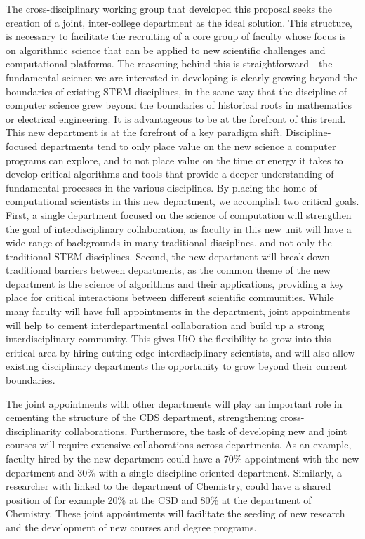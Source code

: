\documentclass[%
oneside,                 %
final,                   %
10pt]{article}
\begin{document}
The cross-disciplinary  working group  that developed this
proposal seeks the creation of a joint, inter-college department as the ideal solution. This
structure, is necessary to facilitate the recruiting of a core
group of faculty whose focus is on algorithmic science that can be applied to new scientific
challenges and computational platforms. The reasoning behind this is straightforward - the
fundamental science we are interested in developing is clearly
growing beyond the boundaries of existing STEM disciplines, in the same way that the discipline
of computer science grew beyond the boundaries of historical roots in mathematics or electrical
engineering. It is advantageous to be at the forefront of this trend.
This new department is at the forefront of a key paradigm shift. Discipline-focused departments
tend to only place value on the new science a computer programs can explore, and to not place
value on the time or energy it takes to develop critical algorithms and tools that provide a deeper
understanding of fundamental processes in the various disciplines. By placing the 
home of computational scientists in this new department, we accomplish two critical goals.
First, a single department focused on the science of computation will strengthen the goal of
interdisciplinary collaboration, as faculty in this new unit will have a wide range of backgrounds
in many traditional disciplines, and not only the traditional STEM disciplines. Second, the new department will break down traditional
barriers between departments, as the
common theme of the new department is the science of algorithms and their applications, providing a key place for critical interactions between
different scientific communities.
While many faculty will have full appointments in the department, joint appointments will help to
cement interdepartmental collaboration and build up a strong interdisciplinary community. This
gives UiO the flexibility to grow into this critical area by hiring cutting-edge interdisciplinary
scientists, and will also allow existing disciplinary departments the opportunity to grow beyond
their current boundaries. 

The joint appointments with other departments will play an important role in cementing the structure of the CDS department, strengthening cross-disciplinarity collaborations. Furthermore, the task of developing new and joint courses will require extensive collaborations across departments. As an example, faculty hired by the new department could have a 70\% appointment with the new department and 30\% with a single discipline oriented department. Similarly, a researcher with linked to the department of Chemistry, could have a shared position of for example  20\% at the CSD and 80\% at the department of  Chemistry. These joint appointments will facilitate the seeding of new research and the development of new courses and degree programs. 
\end{document}
